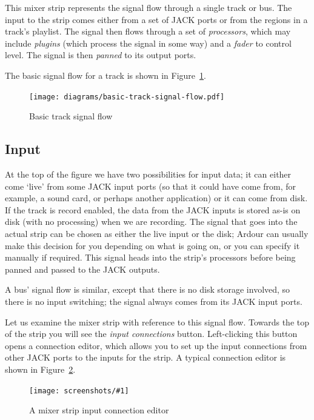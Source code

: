 \documentclass[10pt,a4paper]{book}
\newcommand{\screenshot}[3]{%
\begin{figure}[ht]%
\begin{center}
\texttt{[image: screenshots/\#1]}
\end{center}
\caption{#2}
\label{#3}
\end{figure}}
\begin{document}
{This mixer strip represents the signal flow through a single track or
bus.  The input to the strip comes either from a set of JACK ports or
from the regions in a track's playlist.  The signal then flows through
a set of \emph{processors}, which may include \emph{plugins} (which
process the signal in some way) and a \emph{fader} to control level.
The signal is then \emph{panned} to its output ports.

The basic signal flow for a track is shown in
Figure~\ref{fig:basic-track-signal-flow}.

\begin{figure}[ht]
\begin{center}
\texttt{[image: diagrams/basic-track-signal-flow.pdf]}
\end{center}
\caption{Basic track signal flow}
\label{fig:basic-track-signal-flow}
\end{figure}

\subsection{Input}

At the top of the figure we have two possibilities for input data; it
can either come `live' from some JACK input ports (so that it could
have come from, for example, a sound card, or perhaps another
application) or it can come from disk.  If the track is record
enabled, the data from the JACK inputs is stored as-is on disk (with
no processing) when we are recording.  The signal that goes into the
actual strip can be chosen as either the live input or the disk;
Ardour can usually make this decision for you depending on what is
going on, or you can specify it manually if required.  This signal
heads into the strip's processors before being panned and passed to
the JACK outputs.

A bus' signal flow is similar, except that there is no disk storage
involved, so there is no input switching; the signal always comes from
its JACK input ports.

Let us examine the mixer strip with reference to this signal flow.
Towards the top of the strip you will see the \emph{input connections}
button.  Left-clicking this button opens a connection editor, which
allows you to set up the input connections from other JACK ports to
the inputs for the strip.  A typical connection editor is shown in
Figure~\ref{fig:input-connection-matrix}.

\screenshot{input-connection-matrix.png}{A mixer strip input connection editor}{fig:input-connection-matrix}

}
\end{document}
